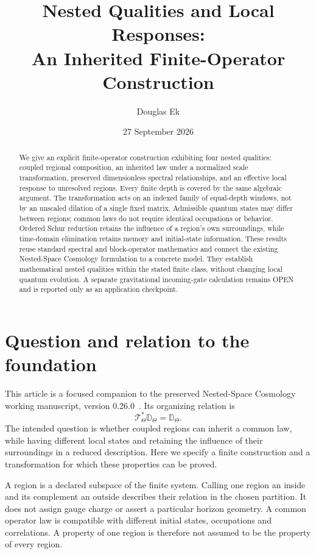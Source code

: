 \documentclass[11pt]{article}
\title{Nested Qualities and Local Responses:\\An Inherited Finite-Operator Construction}
\author{Douglas Ek}
\date{27 September 2026}
\begin{document}
\maketitle
\begin{abstract}
We give an explicit finite-operator construction exhibiting four nested
qualities: coupled regional composition, an inherited law under a normalized
scale transformation, preserved dimensionless spectral relationships, and
an effective local response to unresolved regions. Every finite depth is
covered by the same algebraic argument. The transformation acts on an indexed
family of equal-depth windows, not by an unscaled dilation of a single fixed
matrix. Admissible quantum states may differ between regions; common laws
do not require identical occupations or behavior. Ordered Schur reduction
retains the influence of a region's own surroundings, while time-domain
elimination retains memory and initial-state information. These results reuse
standard spectral and block-operator mathematics and connect the existing
Nested-Space Cosmology formulation to a concrete model. They establish
mathematical nested qualities within the stated finite class, without changing
local quantum evolution. A separate gravitational incoming-gate calculation
remains OPEN and is reported only as an application checkpoint.
\end{abstract}

\section{Question and relation to the foundation}
This article is a focused companion to the preserved Nested-Space Cosmology
working manuscript, version 0.26.0~\cite{EkNSC2026}. Its organizing relation is
\begin{equation}\label{eq:inheritance}
\mathcal T_\Theta^*\mathbb D_\Theta=\mathbb D_\Theta.
\end{equation}
The intended question is whether coupled regions can inherit a common law,
while having different local states and retaining the influence of their
surroundings in a reduced description. Here we specify a finite construction
and a transformation for which these properties can be proved.

A region is a declared subspace of the finite system. Calling one region an
inside and its complement an outside describes their relation in the chosen
partition. It does not assign gauge charge or assert a particular horizon
geometry. A common operator law is compatible with different initial states,
occupations and correlations. A property of one region is therefore not
assumed to be the property of every region.
\end{document}
